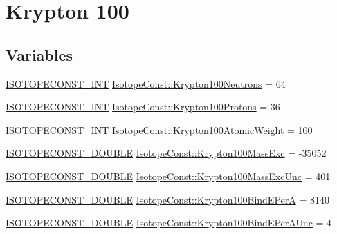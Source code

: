 \hypertarget{group___isotope_const-_krypton-_kr100}{}\section{Krypton 100}
\label{group___isotope_const-_krypton-_kr100}
\subsection*{Variables}
\begin{DoxyCompactItemize}
\item 
\mbox{\hyperlink{group___isotope_const-_macros_ga5f18360b3e99483a35c32d789e62621c}{I\+S\+O\+T\+O\+P\+E\+C\+O\+N\+S\+T\+\_\+\+I\+NT}} \mbox{\hyperlink{group___isotope_const-_krypton-_kr100_ga3c8496200469dda538d529f3dfce9db6}{Isotope\+Const\+::\+Krypton100\+Neutrons}} = 64
\item 
\mbox{\hyperlink{group___isotope_const-_macros_ga5f18360b3e99483a35c32d789e62621c}{I\+S\+O\+T\+O\+P\+E\+C\+O\+N\+S\+T\+\_\+\+I\+NT}} \mbox{\hyperlink{group___isotope_const-_krypton-_kr100_gac5066b0d0bdcce0084002496ec235fbe}{Isotope\+Const\+::\+Krypton100\+Protons}} = 36
\item 
\mbox{\hyperlink{group___isotope_const-_macros_ga5f18360b3e99483a35c32d789e62621c}{I\+S\+O\+T\+O\+P\+E\+C\+O\+N\+S\+T\+\_\+\+I\+NT}} \mbox{\hyperlink{group___isotope_const-_krypton-_kr100_gaed97f1d57ce2f0c62b97997c43e58ad3}{Isotope\+Const\+::\+Krypton100\+Atomic\+Weight}} = 100
\item 
\mbox{\hyperlink{group___isotope_const-_macros_ga8f45a7272ce02c0b4c65c44636ed719a}{I\+S\+O\+T\+O\+P\+E\+C\+O\+N\+S\+T\+\_\+\+D\+O\+U\+B\+LE}} \mbox{\hyperlink{group___isotope_const-_krypton-_kr100_ga3452e9c46e9c58f7fc5a174e6a8dd860}{Isotope\+Const\+::\+Krypton100\+Mass\+Exc}} = -\/35052
\item 
\mbox{\hyperlink{group___isotope_const-_macros_ga8f45a7272ce02c0b4c65c44636ed719a}{I\+S\+O\+T\+O\+P\+E\+C\+O\+N\+S\+T\+\_\+\+D\+O\+U\+B\+LE}} \mbox{\hyperlink{group___isotope_const-_krypton-_kr100_ga331ff081bea67d1ebc2e40536e2ef192}{Isotope\+Const\+::\+Krypton100\+Mass\+Exc\+Unc}} = 401
\item 
\mbox{\hyperlink{group___isotope_const-_macros_ga8f45a7272ce02c0b4c65c44636ed719a}{I\+S\+O\+T\+O\+P\+E\+C\+O\+N\+S\+T\+\_\+\+D\+O\+U\+B\+LE}} \mbox{\hyperlink{group___isotope_const-_krypton-_kr100_gaa2b791fed68a0aa3f56bf38fd8579814}{Isotope\+Const\+::\+Krypton100\+Bind\+E\+PerA}} = 8140
\item 
\mbox{\hyperlink{group___isotope_const-_macros_ga8f45a7272ce02c0b4c65c44636ed719a}{I\+S\+O\+T\+O\+P\+E\+C\+O\+N\+S\+T\+\_\+\+D\+O\+U\+B\+LE}} \mbox{\hyperlink{group___isotope_const-_krypton-_kr100_ga9170cdb5d73201e496a96a6349735a72}{Isotope\+Const\+::\+Krypton100\+Bind\+E\+Per\+A\+Unc}} = 4

\end{DoxyCompactItemize}
